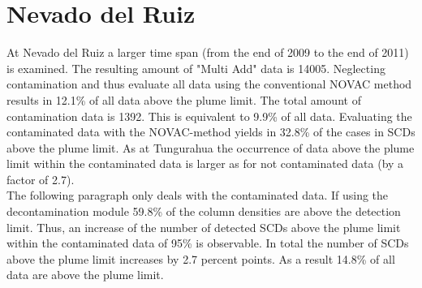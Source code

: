 \documentclass  [
  paper    = a4,
  BCOR     = 10mm,
  twoside,
  fontsize = 12pt,
  fleqn,
  toc      = bibnumbered,
  toc      = listofnumbered,
  numbers  = noendperiod,
  headings = normal,
  listof   = leveldown,
  version  = 3.03
]                                       {scrreprt}
\begin{document}
\section{Nevado del Ruiz}
At Nevado del Ruiz a larger time span (from the end of 2009 to the end of 2011) is examined. The resulting amount of "Multi Add" data is 14005.
Neglecting contamination and thus evaluate all data using the conventional NOVAC method results in 12.1\% of all data above the plume limit. 
The total amount of contamination data is 1392. This is equivalent to 9.9\% of all data. Evaluating the contaminated data with the NOVAC-method yields in 32.8\% of the cases in  SCDs above the plume limit. As at Tungurahua the occurrence of data above the plume limit within the contaminated data is larger as for not contaminated data (by a factor of 2.7).\\
The following paragraph only deals with the contaminated data.
If using the decontamination module 59.8\% of the  column densities are above the detection limit. Thus, an increase of the number of detected  SCDs above the plume limit within the contaminated data of 95\% is observable. In total the number of  SCDs above the plume limit increases by 2.7 percent points. As a result 14.8\% of all data are above the plume limit.\\
\FloatBarrier


%
%
%
\end{document}
